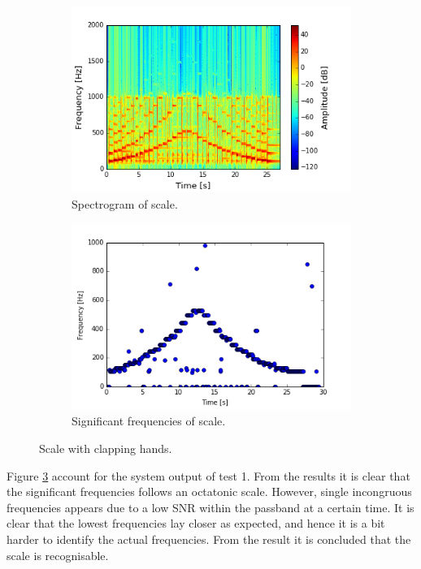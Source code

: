 \begin{figure}[H]
\centering
\begin{subfigure}{0.49\textwidth}
\centering
\includegraphics[width=\textwidth]{figures/validation/systemtest/final_spec1.png}
\caption{Spectrogram of scale.}
\label{fig:final_spec1}
\end{subfigure}
\begin{subfigure}{0.49\textwidth}
\centering
\includegraphics[width=\textwidth]{figures/validation/systemtest/final_peak1.png}
\caption{Significant frequencies of scale.}
\label{fig:final_peak1}
\end{subfigure}
\caption{Scale with clapping hands.}
\label{fig:final_1}
\end{figure} 

Figure \ref{fig:final_1} account for the system output of test 1. From the results it is clear that the significant frequencies follows an octatonic scale. However, single incongruous frequencies appears due to a low SNR within the passband at a certain time.
It is clear that the lowest frequencies lay closer as expected, and hence it is a bit harder to identify the actual frequencies. From the result it is concluded that the scale is recognisable.

